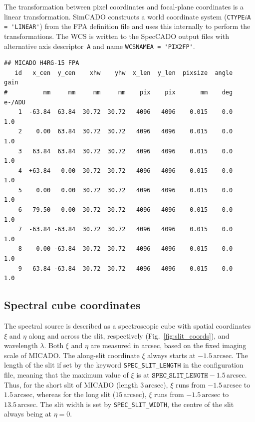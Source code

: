 \documentclass[a4paper,twoside,11pt]{article}
\newcommand{\micron}{\upmu\mathrm{m}}
\begin{document}
The transformation between pixel coordinates and focal-plane
coordinates is a linear transformation. SimCADO constructs a world
coordinate system (\lstinline{CTYPE}$i$\lstinline{A = 'LINEAR'}) from
the FPA definition file and uses this internally to perform the
transformations. The WCS is written to the SpecCADO output files with
alternative axis descriptor~\lstinline{A} and name
\lstinline{WCSNAMEA = 'PIX2FP'}.


\begin{lstlisting}[style=csh,float, caption=Focal plane array definition file for MICADO with nine HAWAII4RG chips with $15\,\micron$ pixels, label=lst:FPA_definition]
## MICADO H4RG-15 FPA
   id   x_cen  y_cen    xhw    yhw  x_len  y_len  pixsize  angle    gain
#          mm     mm     mm     mm    pix    pix       mm    deg  e-/ADU
    1  -63.84  63.84  30.72  30.72   4096   4096    0.015    0.0     1.0
    2    0.00  63.84  30.72  30.72   4096   4096    0.015    0.0     1.0
    3   63.84  63.84  30.72  30.72   4096   4096    0.015    0.0     1.0
    4  +63.84   0.00  30.72  30.72   4096   4096    0.015    0.0     1.0
    5    0.00   0.00  30.72  30.72   4096   4096    0.015    0.0     1.0
    6  -79.50   0.00  30.72  30.72   4096   4096    0.015    0.0     1.0
    7  -63.84 -63.84  30.72  30.72   4096   4096    0.015    0.0     1.0
    8    0.00 -63.84  30.72  30.72   4096   4096    0.015    0.0     1.0
    9   63.84 -63.84  30.72  30.72   4096   4096    0.015    0.0     1.0
\end{lstlisting}


\subsection{Spectral cube coordinates}
\label{ssec:cube_coordinates}

The spectral source is described as a spectroscopic cube with spatial
coordinates $\xi$ and $\eta$ along and across the slit, respectively
(Fig.~\ref{fig:slit_coords}), and wavelength $\lambda$. Both $\xi$ and
$\eta$ are measured in arcsec, based on the fixed imaging scale of
MICADO. The along-slit coordinate $\xi$ always starts at
$-1.5\,\mathrm{arcsec}$. The length of the slit if set by the keyword
\lstinline{SPEC_SLIT_LENGTH} in the configuration file, meaning that
the maximum value of $\xi$ is at
$\mathtt{SPEC\_SLIT\_LENGTH} - 1.5$\,arcsec. Thus, for the short slit
of MICADO (length $3\,\mathrm{arcsec}$), $\xi$ runs from
$-1.5\,\mathrm{arcsec}$ to $1.5\,\mathrm{arcsec}$, whereas for the
long slit ($15\,\mathrm{arcsec}$), $\xi$ runs from
$-1.5\,\mathrm{arcsec}$ to $13.5\,\mathrm{arcsec}$. The slit width is
set by \lstinline{SPEC_SLIT_WIDTH}, the centre of the slit always
being at $\eta=0$.
\end{document}
